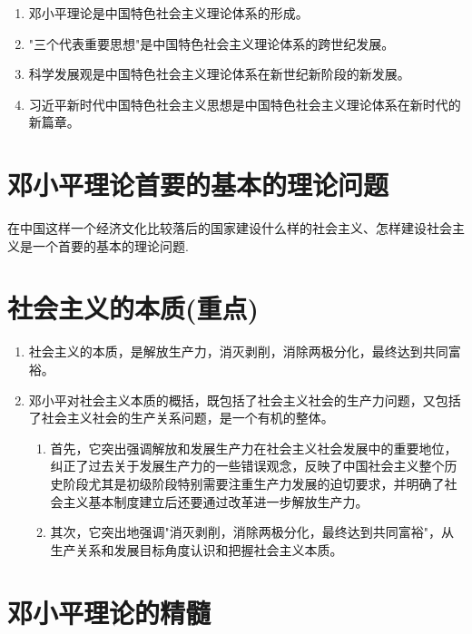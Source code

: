 \documentclass[12pt, a4paper, oneside]{ctexbook}
\begin{document}
\begin{enumerate}
\item 邓小平理论是中国特色社会主义理论体系的形成。

\item "三个代表重要思想"是中国特色社会主义理论体系的跨世纪发展。

\item 科学发展观是中国特色社会主义理论体系在新世纪新阶段的新发展。

\item 习近平新时代中国特色社会主义思想是中国特色社会主义理论体系在新时代的新篇章。
\end{enumerate}

\section{邓小平理论首要的基本的理论问题}

在中国这样一个经济文化比较落后的国家建设什么样的社会主义、怎样建设社会主义是一个首要的基本的理论问题.

\section{社会主义的本质(重点)}

\begin{enumerate}
\item 社会主义的本质，是解放生产力，消灭剥削，消除两极分化，最终达到共同富裕。

\item 邓小平对社会主义本质的概括，既包括了社会主义社会的生产力问题，又包括了社会主义社会的生产关系问题，是一个有机的整体。

\begin{enumerate}[label=(\arabic*)]
\item 首先，它突出强调解放和发展生产力在社会主义社会发展中的重要地位，纠正了过去关于发展生产力的一些错误观念，反映了中国社会主义整个历史阶段尤其是初级阶段特别需要注重生产力发展的迫切要求，并明确了社会主义基本制度建立后还要通过改革进一步解放生产力。

\item 其次，它突出地强调"消灭剥削，消除两极分化，最终达到共同富裕"，从生产关系和发展目标角度认识和把握社会主义本质。
\end{enumerate}
\end{enumerate}

\section{邓小平理论的精髓}
\end{document}
